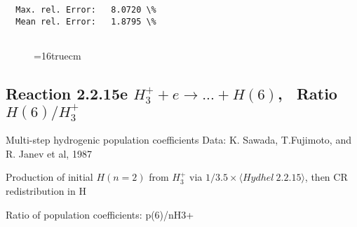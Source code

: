 \documentclass[12pt,dvipdfmx]{article}
\begin{document}
\begin{small}
\begin{verbatim}
  Max. rel. Error:   8.0720 \%
  Mean rel. Error:   1.8795 \%


\end{verbatim}\end{small}
\begin{figure} \label{2.2.15d}
\epsfxsize=16truecm
\end{figure}
\newpage
\subsection{
Reaction 2.2.15e $ H_3^+ + e \rightarrow ...+ H(6) $, \   Ratio $H(6)/H_3^+  $
}

 Multi-step hydrogenic population coefficients
 Data: K. Sawada, T.Fujimoto, \cite{kn:Sawada} and R. Janev et al, 1987

 Production of initial $H(n=2)$ from $H_3^+$ via $1/3.5 \times \langle Hydhel~ 2.2.15\rangle$,
 then CR redistribution in H

 Ratio of population coefficients: p(6)/nH3+
\end{document}
